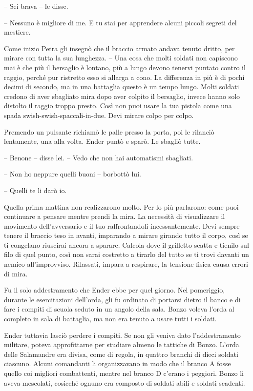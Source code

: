 {-- Sei brava -- le disse.}

{-- Nessuno è migliore di me. E tu stai per apprendere alcuni piccoli
	segreti del mestiere.}

{Come inizio Petra gli insegnò che il braccio armato andava tenuto
	dritto, per mirare con tutta la sua lunghezza. -- Una cosa che molti
	soldati non capiscono mai è che più il bersaglio è lontano, più a lungo
	devono tenervi puntato contro il raggio, perché pur ristretto esso si
	allarga a cono. La differenza in più è di pochi decimi di secondo, ma in
	una battaglia questo è un tempo lungo. Molti soldati credono di aver
	sbagliato mira dopo aver colpito il bersaglio, invece hanno solo
	distolto il raggio troppo presto. Così non puoi usare la tua pistola
	come una spada swish-swish-spaccali-in-due. Devi mirare colpo per
	colpo.}

{Premendo un pulsante richiamò le palle presso la porta, poi le rilanciò
	lentamente, una alla volta. Ender puntò e sparò. Le sbagliò tutte.}

{-- Benone -- disse lei. -- Vedo che non hai automatismi sbagliati.}

{-- Non ho neppure quelli buoni -- borbottò lui.}

{-- Quelli te li darò io.}

{Quella prima mattina non realizzarono molto. Per lo più parlarono: come
	puoi continuare a pensare mentre prendi la mira. La necessità di
	visualizzare il movimento dell'avversario e il tuo raffrontandoli
	incessantemente. Devi sempre tenere il braccio teso in avanti, imparando
	a mirare girando tutto il corpo, così se ti congelano riuscirai ancora a
	sparare. Calcola dove il grilletto scatta e tienilo sul filo di quel
	punto, così non sarai costretto a tirarlo del tutto se ti trovi davanti
	un nemico all'improvviso. Rilassati, impara a respirare, la tensione
	fisica causa errori di mira.}

{Fu il solo addestramento che Ender ebbe per quel giorno. Nel
	pomeriggio, durante le esercitazioni dell'orda, gli fu ordinato di
	portarsi dietro il banco e di fare i compiti di scuola seduto in un
	angolo della sala. Bonzo voleva l'orda al completo in sala di battaglia,
	ma non era tenuto a usare tutti i soldati.}

{Ender tuttavia lasciò perdere i compiti. Se non gli veniva dato
	l'addestramento militare, poteva approfittarne per studiare almeno le
	tattiche di Bonzo. L'orda delle Salamandre era divisa, come di regola,
	in quattro branchi di dieci soldati ciascuno. Alcuni comandanti li
	organizzavano in modo che il branco A fosse quello coi migliori
	combattenti, mentre nel branco D c'erano i peggiori. Bonzo li aveva
	mescolati, cosicché ognuno era composto di soldati abili e soldati
	scadenti.}

